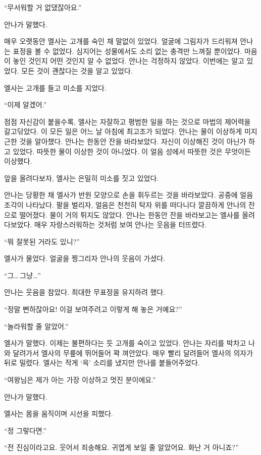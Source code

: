 ``무서워할 거 없댔잖아요.''

안나가 말했다.

매우 오랫동안 엘사는 고개를 숙인 채 말없이 있었다. 얼굴에 그림자가 드리워져 안나는 표정을 볼 수 없었다. 심지어는 성물에서도 소리 없는 충격만 느껴질 뿐이었다. 마음이 놓인 것인지 어떤 것인지 알 수 없었다. 안나는 걱정하지 않았다. 이번에는 알고 있었다. 모든 것이 괜찮다는 것을 알고 있었다.

엘사는 고개를 들고 미소를 지었다.

``이제 알겠어.''

\textbreak

점점 자신감이 붙을수록, 엘사는 자잘하고 평범한 일을 하는 것으로 마법의 제어력을 갈고닦았다. 이 모든 일은 어느 날 아침에 최고조가 되었다. 안나는 물이 이상하게 미지근한 것을 알아챘다. 안나는 한동안 잔을 바라보았다. 자신이 이상해진 것이 아닌가 하고 있었다. 따뜻한 물이 이상한 것이 아니었다. 이 얼음 성에서 따뜻한 것은 무엇이든 이상했다.

앞을 올려다보자, 엘사는 은밀히 미소를 짓고 있었다.

안나는 당황한 채 엘사가 반원 모양으로 손을 휘두르는 것을 바라보았다. 공중에 얼음 조각이 나타났다. 팔을 벌리자, 얼음은 천천히 탁자 위를 떠다니다 깔끔하게 안나의 잔으로 떨어졌다. 물이 거의 튀지도 않았다. 안나는 한동안 잔을 바라보고는 엘사를 올려다보았다. 매우 자랑스러워하는 것처럼 보여 안나는 웃음을 터뜨렸다.

``뭐 잘못된 거라도 있니?''

엘사가 물었다. 얼굴을 찡그리자 안나의 웃음이 가셨다.

``그\ldots\,그냥\ldots''

안나는 웃음을 참았다. 최대한 무표정을 유지하려 했다.

``정말 뻔하잖아요! 이걸 보여주려고 이렇게 해 놓은 거예요?''

``놀라워할 줄 알았어.''

엘사가 말했다. 이제는 불편하다는 듯 고개를 숙이고 있었다. 안나는 자리를 박차고 나와 달려가서 엘사의 무릎에 뛰어들어 꽉 껴안았다. 매우 빨리 달려들어 엘사의 의자가 뒤로 밀렸다. 엘사는 작게 `윽' 소리를 냈지만 안나를 붙들어주었다.

``여왕님은 제가 아는 가장 이상하고 멋진 분이에요.''

안나가 말했다.

엘사는 몸을 움직이며 시선을 피했다.

``정 그렇다면.''

``전 진심이라고요. 웃어서 죄송해요. 귀엽게 보일 줄 알았어요. 화난 거 아니죠?''

